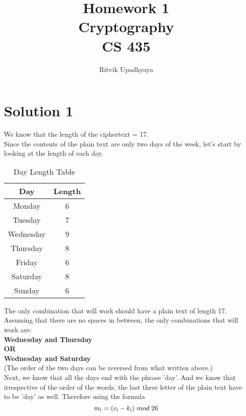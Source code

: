 \documentclass{article}
\title{\Huge Homework 1
		\\\LARGE Cryptography
		\\\LARGE CS 435
		\vspace{2pc}}
\author{Ritvik Upadhyaya}
\date{}
\newcommand\tab[1][1cm]{\hspace*{#1}}
\begin{document}
	\maketitle

	\newpage

	\section*{Solution 1}
        We know that the length of the ciphertext = 17.\\
        Since the contents of the plain text are only two days of the week, let's start by looking at the length of each day.
        \begin{table}[H]
            \centering
            \caption{Day Length Table}
            \label{tab:table1}

            \begin{tabular}{|c|c|}

                \toprule
                Day & Length\\
                \midrule
                Monday & 6\\
                \hline
                Tuesday & 7\\
                \hline
                Wednesday & 9\\
                \hline
                Thursday & 8\\
                \hline
                Friday & 6\\
                \hline
                Saturday & 8\\
                \hline
                Sunday & 6\\
                \hline
            \end{tabular}
        \end{table}
        The only combination that will work should have a plain text of length 17. Assuming that there are no spaces in between, the only combinations that will work are:\\
        \textbf{
        \tab \tab \tab \tab \tab \textbullet{}Wednesday and Thursday\\
        \tab \tab \tab \tab \tab \tab \tab OR\\
        \tab \tab \tab \tab \tab \textbullet{}Wednesday and Saturday}\\
        (The order of the two days can be reversed from what written above.)\\
        Next, we know that all the days end with the phrase 'day'. And we know that irrespective of the order of the words, the last three letter of the plain text have to be 'day' as well. Therefore using the formula $$m\textsubscript{i} = (c\textsubscript{i}-k\textsubscript{i})\; mod\; 26$$\\
\end{document}
